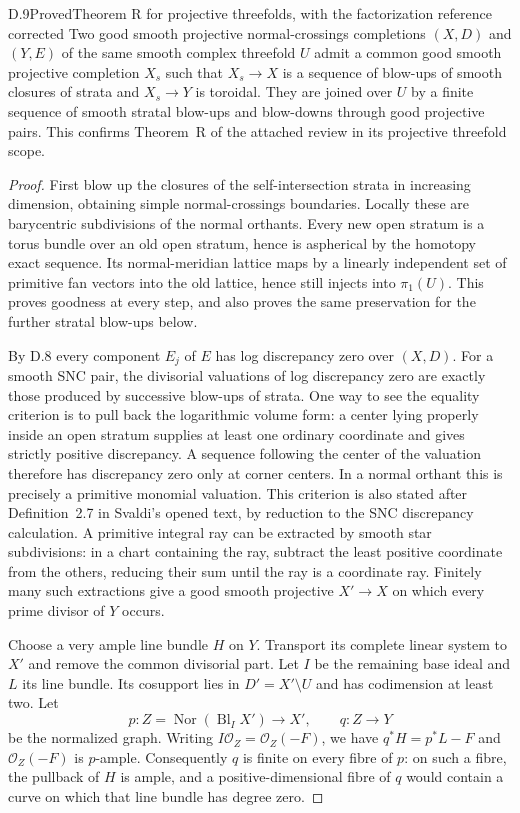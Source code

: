\begin{result}{D.9}{Proved}{Theorem R for projective threefolds, with the factorization reference corrected}
Two good smooth projective normal-crossings completions $(X,D)$ and $(Y,E)$ of the same smooth complex threefold $U$ admit a common good smooth projective completion $X_s$ such that $X_s\to X$ is a sequence of blow-ups of smooth closures of strata and $X_s\to Y$ is toroidal. They are joined over $U$ by a finite sequence of smooth stratal blow-ups and blow-downs through good projective pairs. This confirms Theorem~R of the attached review in its projective threefold scope.
\end{result}
\begin{proof}
First blow up the closures of the self-intersection strata in increasing dimension, obtaining simple normal-crossings boundaries. Locally these are barycentric subdivisions of the normal orthants. Every new open stratum is a torus bundle over an old open stratum, hence is aspherical by the homotopy exact sequence. Its normal-meridian lattice maps by a linearly independent set of primitive fan vectors into the old lattice, hence still injects into $\pi_1(U)$. This proves goodness at every step, and also proves the same preservation for the further stratal blow-ups below.

By D.8 every component $E_j$ of $E$ has log discrepancy zero over $(X,D)$. For a smooth SNC pair, the divisorial valuations of log discrepancy zero are exactly those produced by successive blow-ups of strata. One way to see the equality criterion is to pull back the logarithmic volume form: a center lying properly inside an open stratum supplies at least one ordinary coordinate and gives strictly positive discrepancy. A sequence following the center of the valuation therefore has discrepancy zero only at corner centers. In a normal orthant this is precisely a primitive monomial valuation. This criterion is also stated after Definition~2.7 in Svaldi's opened text, by reduction to the SNC discrepancy calculation. A primitive integral ray can be extracted by smooth star subdivisions: in a chart containing the ray, subtract the least positive coordinate from the others, reducing their sum until the ray is a coordinate ray. Finitely many such extractions give a good smooth projective $X'\to X$ on which every prime divisor of $Y$ occurs.

Choose a very ample line bundle $H$ on $Y$. Transport its complete linear system to $X'$ and remove the common divisorial part. Let $I$ be the remaining base ideal and $L$ its line bundle. Its cosupport lies in $D'=X'\setminus U$ and has codimension at least two. Let
\[
 p:Z=\operatorname{Nor}(\operatorname{Bl}_I X')\longrightarrow X',
 \qquad q:Z\longrightarrow Y
\]
be the normalized graph. Writing $I\mathcal O_Z=\mathcal O_Z(-F)$, we have $q^*H=p^*L-F$ and $\mathcal O_Z(-F)$ is $p$-ample. Consequently $q$ is finite on every fibre of $p$: on such a fibre, the pullback of $H$ is ample, and a positive-dimensional fibre of $q$ would contain a curve on which that line bundle has degree zero.


\end{proof}
